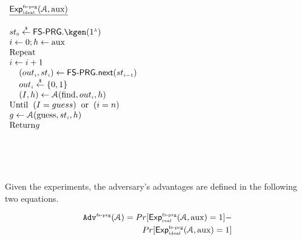    
   
   \begin{center}
   \begin{minipage}{57mm}
   
\begin{tcolorbox}[left=0mm]
$
  \begin{array}{l}
 \underline{\mathsf{Exp}_{\sss \text{ideal}}^{\sss \text{fs-prg}}(\mathcal{A}, \text{aux})}\\
  \\
   {st}_{\sss 0}\stackrel{\sss \$}\leftarrow \mathsf{FS\text{-}PRG}.\kgen (1^{\sss \lambda}) \\
%
i\gets 0; h\gets \text{aux} \\
\text {Repeat}\\
i\gets i+1\\
\hspace{4mm} ({out}_{\sss i}, st_{\sss i})\leftarrow  \mathsf{FS\text{-}PRG.next}   (st_{\sss i-1})\\
\hspace{4mm}{out}_{\sss i}\stackrel{\sss \$}\leftarrow\{0, 1\}\\
\hspace{4mm}  (I,h)\gets\mathcal{A}(\text{find}, out_{\sss i}, h)\\
\text{Until}\hspace{2mm}  (I=guess)\hspace{2mm}  \text{or}\hspace{2mm}  (i=n)\\
g\gets\mathcal{A}(\text{guess}, st_{\sss i}, h)\\
\text{Return} g\\
  \end{array}%
$
\end{tcolorbox}
   \end{minipage}
        \end{center}
\

\

Given the experiments, the adversary's advantages are defined in the following two equations. 


\begin{equation}\label{equ::adv-1st-term}
\begin{split}
\mathtt{Adv}^{\scriptscriptstyle \text{fs-prg}}(\mathcal{A})=Pr[\mathsf{Exp}_{\scriptscriptstyle \text{real}}^{\scriptscriptstyle \text{fs-prg}}(\mathcal{A},\text{aux})=1]-\\ Pr[\mathsf{Exp}_{\scriptscriptstyle \text{ideal}}^{\scriptscriptstyle \text{fs-prg}}(\mathcal{A},\text{aux})=1]
\end{split}
\end{equation}


